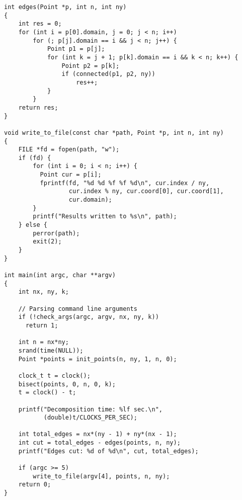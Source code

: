 \documentclass[oneside,final,14pt]{extreport}
\begin{document}
\begin{verbatim}
int edges(Point *p, int n, int ny)
{
    int res = 0;
    for (int i = p[0].domain, j = 0; j < n; i++)
        for (; p[j].domain == i && j < n; j++) {
            Point p1 = p[j];
            for (int k = j + 1; p[k].domain == i && k < n; k++) {
                Point p2 = p[k];
                if (connected(p1, p2, ny))
                    res++;
            }
        }
    return res;
}

void write_to_file(const char *path, Point *p, int n, int ny)
{
    FILE *fd = fopen(path, "w");
    if (fd) {
        for (int i = 0; i < n; i++) {
          Point cur = p[i];
          fprintf(fd, "%d %d %f %f %d\n", cur.index / ny,
                  cur.index % ny, cur.coord[0], cur.coord[1],
                  cur.domain);
        }
        printf("Results written to %s\n", path);
    } else {
        perror(path);
        exit(2);
    }
}

int main(int argc, char **argv)
{
    int nx, ny, k;

    // Parsing command line arguments
    if (!check_args(argc, argv, nx, ny, k))
      return 1;

    int n = nx*ny;
    srand(time(NULL));
    Point *points = init_points(n, ny, 1, n, 0);

    clock_t t = clock();
    bisect(points, 0, n, 0, k);
    t = clock() - t;

    printf("Decomposition time: %lf sec.\n",
           (double)t/CLOCKS_PER_SEC);

    int total_edges = nx*(ny - 1) + ny*(nx - 1);
    int cut = total_edges - edges(points, n, ny);
    printf("Edges cut: %d of %d\n", cut, total_edges);

    if (argc >= 5)
        write_to_file(argv[4], points, n, ny);
    return 0;
}

\end{verbatim}
\end{document}
